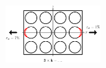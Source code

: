 \documentclass[first,firstsupp,lastsupp,last,hyperref,table]{ETHclass}
\begin{document}
\begin{frame}
\begin{columns}[c]
\begin{column}{0.5\textwidth}
\begin{figure}
\end{figure}
\end{column}
\end{columns}
\vspace{-0.25cm}
\begin{figure}
\centering
\includegraphics[width=0.325\textwidth]{twofibers-sameside-strainmagni3.pdf}
\end{figure}
\end{frame}

\addtocounter{framenumber}{-1}
\end{document}
